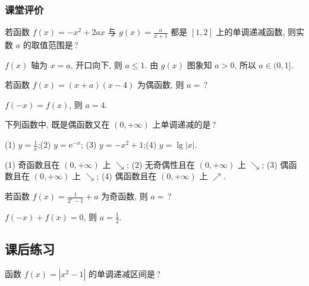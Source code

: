   \subsubsection{课堂评价}
  \begin{exercise}
    若函数 $f(x)=-x^2+2ax$ 与 $g(x)=\frac{a}{x+1}$ 都是 $[1,2]$ 上的单调递减函数, 则实数 $a$ 的取值范围是\,?
  \end{exercise}

  \beginsolution
    $f(x)$ 轴为 $x=a$, 开口向下, 则 $a\leqslant 1$. 由 $g(x)$ 图象知 $a>0$, 所以 $a\in(0,1]$.
  \endsolution
  
  \begin{exercise}
    若函数 $f(x)=(x+a)(x-4)$ 为偶函数, 则 $a=$\,?
  \end{exercise}

  \beginsolution
    $f(-x)=f(x)$, 则 $a=4$.
  \endsolution
  
  \begin{exercise}
    下列函数中, 既是偶函数又在 $(0,+\infty)$ 上单调递减的是\,?
    
    (1) $y=\frac1x$;\qquad (2) $y= \mathrm{e}^{-x}$;\qquad
    (3) $y= -x^2+1$;\qquad (4) $y= \lg|x|$.
  \end{exercise}

  \beginsolution
    (1) 奇函数且在 $(0,+\infty)$ 上 $\searrow$; 
    (2) 无奇偶性且在 $(0,+\infty)$ 上 $\searrow$; 
    (3) 偶函数且在 $(0,+\infty)$ 上 $\searrow$; 
    (4) 偶函数且在 $(0,+\infty)$ 上 $\nearrow$.
  \endsolution

  \begin{exercise}
    若函数 $f(x)= \frac1{2^x-1}+a$ 为奇函数, 则 $a=$\,?
  \end{exercise}

  \beginsolution
    $f(-x)+f(x)=0$, 则 $a=\frac12$.
  \endsolution
  
  \subsection{课后练习}  

  \begin{exercise}
    函数 $f(x)=|x^2-1|$ 的单调递减区间是\,?
  \end{exercise}

